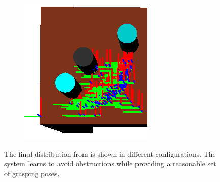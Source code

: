 \begin{figure}
\begin{subfigure}[b]{0.3\linewidth}
    \caption{}
  \end{subfigure}
  \begin{subfigure}[b]{0.3\linewidth}
    \includegraphics[width=\textwidth]{images/finalgraspobstr2.png}
    \caption{}
  \end{subfigure}
  \caption{The final distribution from 
is shown in different configurations. The system learns to
avoid obstructions while providing a reasonable set of grasping poses.}
  \label{fig:obstr}
\end{figure}

